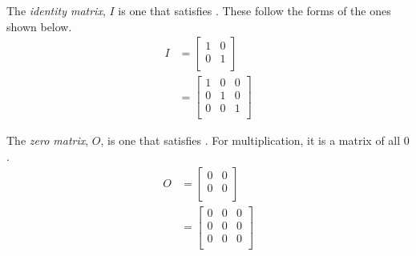 \begin{definition}\label{def:Multiplicative_Identity_Matrix}
  The \emph{identity matrix}, $I$ is one that satisfies .
  These follow the forms of the ones shown below.
  \begin{equation}\label{eq:Multiplicative_Identity_Matrix}
    \begin{aligned}
      I &=
      \begin{bmatrix}
        1 & 0 \\
        0 & 1 \\
      \end{bmatrix} \\
      &=
      \begin{bmatrix}
        1 & 0 & 0 \\
        0 & 1 & 0 \\
        0 & 0 & 1 \\
      \end{bmatrix}
    \end{aligned}
  \end{equation}
\end{definition}

\begin{definition}\label{def:Zero_Matrix}
  The \emph{zero matrix}, $O$, is one that satisfies .
  For  multiplication, it is a matrix of all $0$.
  \begin{equation}
    \label{eq:3}
    \begin{aligned}
      O &=
      \begin{bmatrix}
        0 & 0 \\
        0 & 0 \\
      \end{bmatrix} \\
      &=
      \begin{bmatrix}
        0 & 0 & 0 \\
        0 & 0 & 0 \\
        0 & 0 & 0 \\
      \end{bmatrix}
    \end{aligned}
  \end{equation}
\end{definition}

